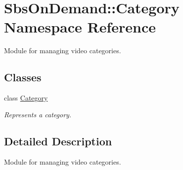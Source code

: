 \hypertarget{namespace_sbs_on_demand_1_1_category}{
\section{\-Sbs\-On\-Demand\-:\-:\-Category \-Namespace \-Reference}
\label{namespace_sbs_on_demand_1_1_category}
}


\-Module for managing video categories.  


\subsection*{\-Classes}
\begin{DoxyCompactItemize}
\item 
class \hyperlink{class_sbs_on_demand_1_1_category_1_1_category}{\-Category}
\begin{DoxyCompactList}\small\item\em \-Represents a category. \end{DoxyCompactList}\end{DoxyCompactItemize}


\subsection{\-Detailed \-Description}
\-Module for managing video categories. 